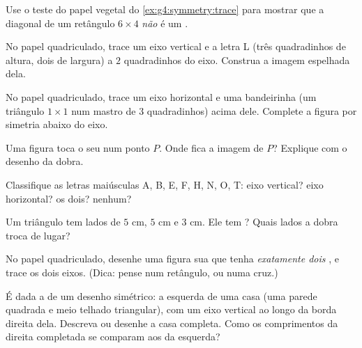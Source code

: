 \begin{exercise}[$\star$]\label{exo:g4:symmetry:3}
Use o teste do papel vegetal do \cref{ex:g4:symmetry:trace} para
mostrar que a diagonal de um retângulo $6 \times 4$ \emph{não} é um
.
\end{exercise}

\begin{exercise}[$\star$]\label{exo:g4:symmetry:4}
No papel quadriculado, trace um eixo vertical e a letra L (três
quadradinhos de altura, dois de largura) a $2$ quadradinhos do eixo.
Construa a imagem espelhada dela.
\end{exercise}

\begin{exercise}[$\star$]\label{exo:g4:symmetry:5}
No papel quadriculado, trace um eixo horizontal e uma bandeirinha (um
triângulo $1 \times 1$ num mastro de $3$ quadradinhos) acima dele.
Complete a figura por simetria abaixo do eixo.
\end{exercise}

\begin{exercise}[$\star$]\label{exo:g4:symmetry:6}
Uma figura toca o seu  num ponto $P$. Onde fica a
imagem de $P$? Explique com o desenho da dobra.
\end{exercise}

\begin{exercise}[$\star$]\label{exo:g4:symmetry:7}
Classifique as letras maiúsculas A, B, E, F, H, N, O, T: eixo
vertical? eixo horizontal? os dois? nenhum?
\end{exercise}

\begin{exercise}[$\star$]\label{exo:g4:symmetry:8}
Um triângulo tem lados de $5$ cm, $5$ cm e $3$ cm. Ele tem ? Quais lados a dobra troca de lugar?
\end{exercise}

\begin{exercise}[$\star\star$]\label{exo:g4:symmetry:9}
No papel quadriculado, desenhe uma figura sua que tenha
\emph{exatamente dois} , e trace os dois eixos.
(Dica: pense num retângulo, ou numa cruz.)
\end{exercise}

\begin{exercise}[$\star\star$]\label{exo:g4:symmetry:10}
É dada a  de um desenho simétrico: a  esquerda de uma
casa (uma parede quadrada e meio telhado triangular), com um eixo
vertical ao longo da borda direita dela. Descreva ou desenhe a casa
completa. Como os comprimentos da  direita completada se
comparam aos da  esquerda?
\end{exercise}

